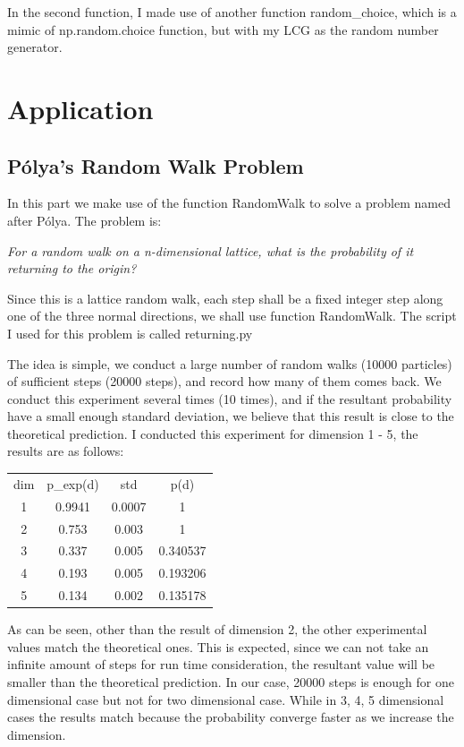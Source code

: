 \documentclass{article}
\begin{document}
In the second function, I made use of another function random\_choice, which is a 
mimic of np.random.choice function, but with my LCG as the random number generator.

\section{Application}

\subsection{P\'olya's Random Walk Problem}

In this part we make use of the function RandomWalk to solve a problem named after  
P\'olya. The problem is:

\begin{center}
	\textit{
	For a random walk on a n-dimensional lattice, what is the probability of it
	returning to the origin?
	}
\end{center}

Since this is a lattice random walk, each step shall be a fixed integer step along one
of the three normal directions, we shall use function RandomWalk. The script I used for
this problem is called returning.py

The idea is simple, we conduct a large number of random walks (10000 particles) of 
sufficient steps (20000 steps), and record how many of them comes back. We conduct 
this experiment several times (10 times), and if the resultant probability have a small 
enough standard deviation, we believe that this result is close to the theoretical 
prediction. I conducted this experiment for dimension 1 - 5, the results are as follows:

\begin{center}
\begin{tabular}{ c c c c }
	dim & p\_exp(d) & std & p(d) \\
	1 & 0.9941& 0.0007& 1 \\
	2 & 0.753& 0.003& 1 \\
	3 & 0.337& 0.005& 0.340537 \\
	4 & 0.193& 0.005& 0.193206 \\
	5 & 0.134& 0.002& 0.135178
\end{tabular}
\end{center}

As can be seen, other than the result of dimension 2, the other experimental values match
the theoretical ones. This is expected, since we can not take an infinite amount of steps
for run time consideration, the resultant value will be smaller than the theoretical prediction. In our case, 20000 steps is enough for one dimensional case but not for two dimensional case. 
While in 3, 4, 5 dimensional cases the results match because the probability converge faster as we increase the dimension. 
\end{document}
